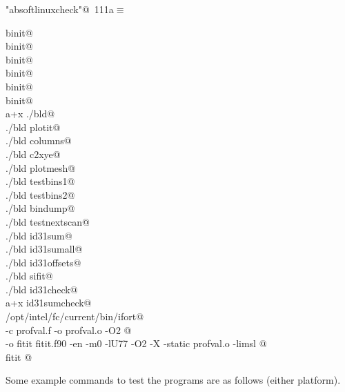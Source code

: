 \documentclass[10pt,a4paper,notitlepage]{article}
\begin{document}
\begin{flushleft} \small
\begin{minipage}{\linewidth}\label{scrap136}\raggedright\small
{} \verb@"absoftlinuxcheck"@\nobreak\ {\footnotesize {111a}}$\equiv$
\vspace{-1ex}
\begin{list}{}{} \item
\mbox{}\verb@nuweb binit@\\
\mbox{}\verb@latex binit@\\
\mbox{}\verb@nuweb binit@\\
\mbox{}\verb@latex binit@\\
\mbox{}\verb@dvipdf binit@\\
\mbox{}\verb@dvips binit@\\
\mbox{}\verb@chmod a+x ./bld@\\
\mbox{}\verb@./bld plotit@\\
\mbox{}\verb@./bld columns@\\
\mbox{}\verb@./bld c2xye@\\
\mbox{}\verb@./bld plotmesh@\\
\mbox{}\verb@./bld testbins1@\\
\mbox{}\verb@./bld testbins2@\\
\mbox{}\verb@./bld bindump@\\
\mbox{}\verb@./bld testnextscan@\\
\mbox{}\verb@./bld id31sum@\\
\mbox{}\verb@./bld id31sumall@\\
\mbox{}\verb@./bld id31offsets@\\
\mbox{}\verb@./bld sifit@\\
\mbox{}\verb@./bld id31check@\\
\mbox{}\verb@chmod a+x id31sumcheck@\\
\mbox{}\verb@/opt/intel/fc/current/bin/ifort@\\
\mbox{} -c profval.f -o profval.o -O2 @\\
\mbox{} -o fitit fitit.f90  -en -m0 -lU77 -O2 -X -static profval.o -limsl @\\
\mbox{}\verb@strip fitit                                                                  @{\NWsep}
\end{list}
\vspace{-1.5ex}
\footnotesize
\begin{list}{}{\setlength{\itemsep}{-\parsep}\setlength{\itemindent}{-\leftmargin}}

\item{}
\end{list}
\end{minipage}\vspace{4ex}
\end{flushleft}
Some example commands to test the programs are as follows (either platform).
\end{document}
